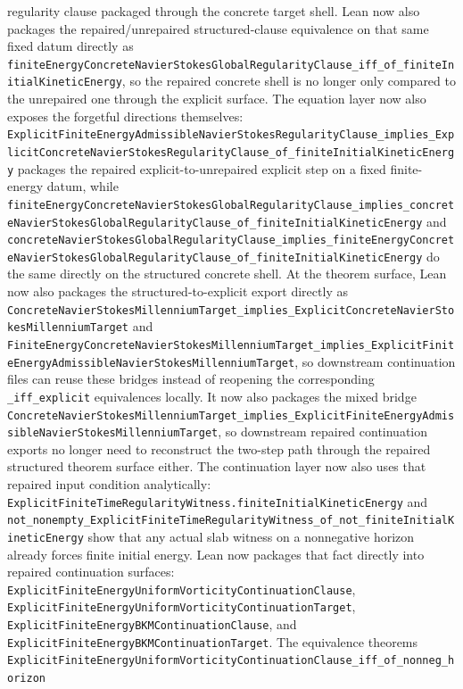 \documentclass[11pt]{article}
\begin{document}
regularity clause packaged through the concrete target shell.
Lean now also packages the repaired/unrepaired structured-clause equivalence on
that same fixed datum directly as
\texttt{finiteEnergyConcreteNavierStokesGlobalRegularityClause\_iff\_of\_finiteInitialKineticEnergy},
so the repaired concrete shell is no longer only compared to the unrepaired one
through the explicit surface.
The equation layer now also exposes the forgetful directions themselves:
\texttt{ExplicitFiniteEnergyAdmissibleNavierStokesRegularityClause\_implies\_ExplicitConcreteNavierStokesRegularityClause\_of\_finiteInitialKineticEnergy}
packages the repaired explicit-to-unrepaired explicit step on a fixed
finite-energy datum, while
\texttt{finiteEnergyConcreteNavierStokesGlobalRegularityClause\_implies\_concreteNavierStokesGlobalRegularityClause\_of\_finiteInitialKineticEnergy}
and
\texttt{concreteNavierStokesGlobalRegularityClause\_implies\_finiteEnergyConcreteNavierStokesGlobalRegularityClause\_of\_finiteInitialKineticEnergy}
do the same directly on the structured concrete shell.
At the theorem surface, Lean now also packages the structured-to-explicit
export directly as
\texttt{ConcreteNavierStokesMillenniumTarget\_implies\_ExplicitConcreteNavierStokesMillenniumTarget}
and
\texttt{FiniteEnergyConcreteNavierStokesMillenniumTarget\_implies\_ExplicitFiniteEnergyAdmissibleNavierStokesMillenniumTarget},
so downstream continuation files can reuse these bridges instead of reopening
the corresponding \texttt{\_iff\_explicit} equivalences locally.
It now also packages the mixed bridge
\texttt{ConcreteNavierStokesMillenniumTarget\_implies\_ExplicitFiniteEnergyAdmissibleNavierStokesMillenniumTarget},
so downstream repaired continuation exports no longer need to reconstruct the
two-step path through the repaired structured theorem surface either.
The continuation layer now
also uses that repaired input condition analytically:
\texttt{ExplicitFiniteTimeRegularityWitness.finiteInitialKineticEnergy} and
\texttt{not\_nonempty\_ExplicitFiniteTimeRegularityWitness\_of\_not\_finiteInitialKineticEnergy}
show that any actual slab witness on a nonnegative horizon already forces
finite initial energy.  Lean now packages that fact directly into repaired
continuation surfaces:
\texttt{ExplicitFiniteEnergyUniformVorticityContinuationClause},
\texttt{ExplicitFiniteEnergyUniformVorticityContinuationTarget},
\texttt{ExplicitFiniteEnergyBKMContinuationClause}, and
\texttt{ExplicitFiniteEnergyBKMContinuationTarget}.  The equivalence theorems
\texttt{ExplicitFiniteEnergyUniformVorticityContinuationClause\_iff\_of\_nonneg\_horizon}
\end{document}
